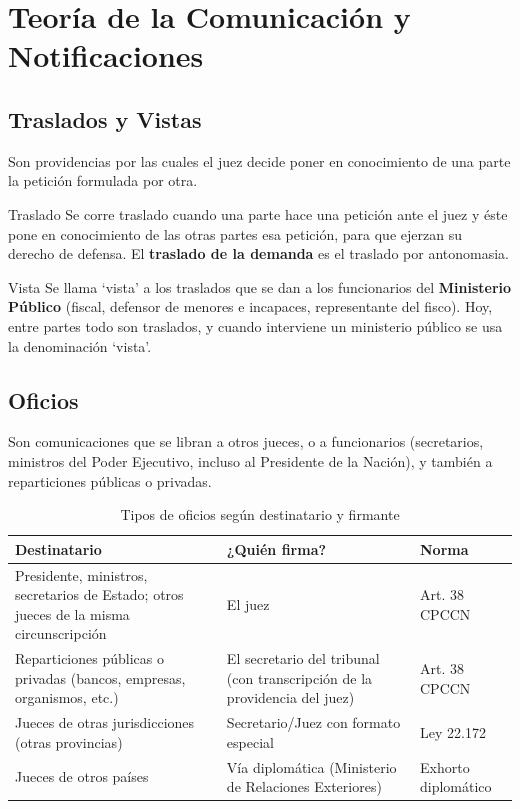\documentclass[12pt,oneside]{book}
\begin{document}
\chapter{Teoría de la Comunicación y Notificaciones}

\section{Traslados y Vistas}

Son providencias por las cuales el juez decide poner en conocimiento de una parte la petición formulada por otra.

\begin{definition}{Traslado}
Se corre traslado cuando una parte hace una petición ante el juez y éste pone en conocimiento de las otras partes esa petición, para que ejerzan su derecho de defensa. El \textbf{traslado de la demanda} es el traslado por antonomasia.
\end{definition}

\begin{definition}{Vista}
Se llama `vista' a los traslados que se dan a los funcionarios del \textbf{Ministerio Público} (fiscal, defensor de menores e incapaces, representante del fisco). Hoy, entre partes todo son traslados, y cuando interviene un ministerio público se usa la denominación `vista'.
\end{definition}

\section{Oficios}

Son comunicaciones que se libran a otros jueces, o a funcionarios (secretarios, ministros del Poder Ejecutivo, incluso al Presidente de la Nación), y también a reparticiones públicas o privadas.

\begin{table}[H]
\centering
\begin{tabularx}{\textwidth}{>{\raggedright\arraybackslash}p{} >{\raggedright\arraybackslash}p{} >{\raggedright\arraybackslash}X}
\toprule
\textbf{Destinatario} & \textbf{¿Quién firma?} & \textbf{Norma} \\
\midrule
Presidente, ministros, secretarios de Estado; otros jueces de la misma circunscripción & El juez & Art. 38 CPCCN \\[0.4em]
Reparticiones públicas o privadas (bancos, empresas, organismos, etc.) & El secretario del tribunal (con transcripción de la providencia del juez) & Art. 38 CPCCN \\[0.4em]
Jueces de otras jurisdicciones (otras provincias) & Secretario/Juez con formato especial & Ley 22.172 \\[0.4em]
Jueces de otros países & Vía diplomática (Ministerio de Relaciones Exteriores) & Exhorto diplomático \\
\bottomrule
\end{tabularx}
\caption{Tipos de oficios según destinatario y firmante}
\end{table}
\end{document}
